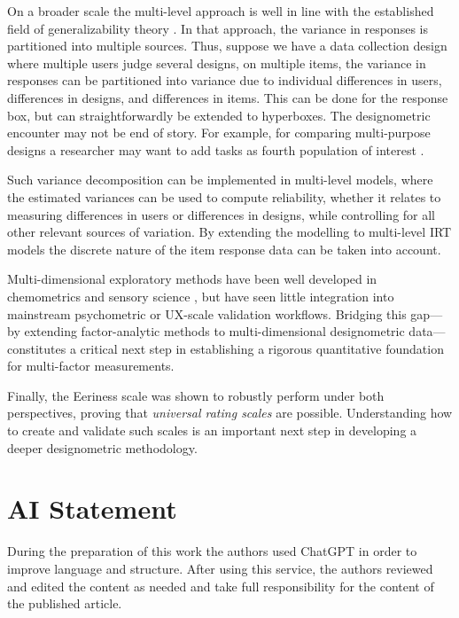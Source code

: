 \documentclass[
  authoryear,
  review]{elsarticle}
\begin{document}
On a broader scale the multi-level approach is well in line with the
established field of generalizability theory \citep{Brennan2001}. In
that approach, the variance in responses is partitioned into multiple
sources. Thus, suppose we have a data collection design where multiple
users judge several designs, on multiple items, the variance in
responses can be partitioned into variance due to individual differences
in users, differences in designs, and differences in items. This can be
done for the response box, but can straightforwardly be extended to
hyperboxes. The designometric encounter may not be end of story. For
example, for comparing multi-purpose designs a researcher may want to
add tasks as fourth population of interest \citep{Schmettow2013s}.

Such variance decomposition can be implemented in multi-level models,
where the estimated variances can be used to compute reliability,
whether it relates to measuring differences in users or differences in
designs, while controlling for all other relevant sources of variation.
By extending the modelling to multi-level IRT models
\citep[\citet{vandenBerg2007}]{Fox2001} the discrete nature of the item
response data can be taken into account.

Multi-dimensional exploratory methods have been well developed in
chemometrics and sensory science
\citep[\citet{Harshman1970}]{Tucker1966}, but have seen little
integration into mainstream psychometric or UX-scale validation
workflows. Bridging this gap---by extending factor-analytic methods to
multi-dimensional designometric data---constitutes a critical next step
in establishing a rigorous quantitative foundation for multi-factor
measurements.

Finally, the Eeriness scale was shown to robustly perform under both
perspectives, proving that \emph{universal rating scales} are possible.
Understanding how to create and validate such scales is an important
next step in developing a deeper designometric methodology.

\section{AI Statement}\label{ai-statement}

During the preparation of this work the authors used ChatGPT in order to
improve language and structure. After using this service, the authors
reviewed and edited the content as needed and take full responsibility
for the content of the published article.


\renewcommand\refname{References}

\end{document}

